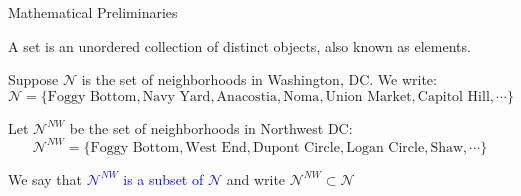 \documentclass[notes,11pt, aspectratio=169, xcolor=table]{beamer}
\newcommand{\blue}[1]{\textcolor{blue}{#1}}
\newcommand{\blue}[1]{\textcolor{blue}{#1}}
\newenvironment{wideitemize}{\itemize\addtolength{\itemsep}{10pt}}{\enditemize}
\begin{document}
\begin{frame}{Mathematical Preliminaries}

\begin{wideitemize}
    \item A set is an unordered collection of distinct objects, also known as elements.
    \item<2-> Suppose $\mathcal{N}$ is the set of neighborhoods in Washington, DC. We write:
    \begin{equation*}
        \mathcal{N} = \{ \text{Foggy Bottom}, \text{Navy Yard}, \text{Anacostia}, \text{Noma}, \text{Union Market}, \text{Capitol Hill}, \cdots \}
    \end{equation*}

    \item<3-> Let $\mathcal{N}^{NW}$ be the set of neighborhoods in Northwest DC:
    \begin{equation*}
        \mathcal{N}^{NW} = \{ \text{Foggy Bottom}, \text{West End}, \text{Dupont Circle}, \text{Logan Circle}, \text{Shaw}, \cdots \}  
    \end{equation*}
          

    \item<4-> We say that \blue{$\mathcal{N}^{NW}$ is a subset of $\mathcal{N}$} and write $\mathcal{N}^{NW} \subset \mathcal{N}$
\end{wideitemize}
    
\end{frame}
\end{document}
